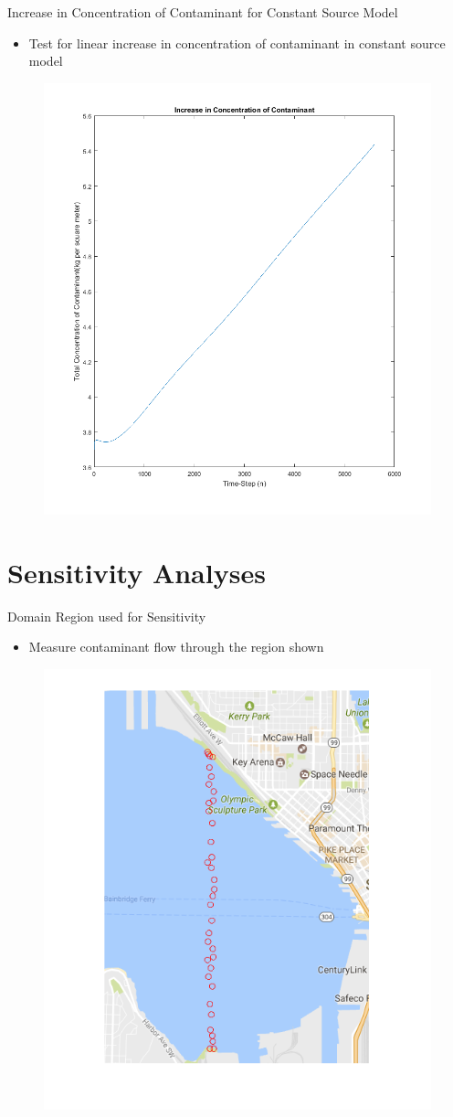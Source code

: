 \documentclass[10pt]{beamer}
\begin{document}
\begin{frame}{Increase in Concentration of Contaminant for Constant Source Model}\label{ConstIncrease}

\begin{itemize}
\item Test for linear increase in concentration of contaminant in constant source model
\end{itemize}

\begin{figure} 
\includegraphics[trim=0mm 0mm 0mm 0mm,clip,width=0.5\linewidth]{constincrease.png}
\end{figure}
\hyperlink{Questions}{}
\end{frame}

\section{Sensitivity Analyses}

\begin{frame}{Domain Region used for Sensitivity}\label{Region}

\begin{itemize}
\item Measure contaminant flow through the region shown
\end{itemize}

\begin{figure} 
\includegraphics[trim=0mm 0mm 0mm 0mm,clip,width=0.5\linewidth]{sensewall.png}
\end{figure}
\hyperlink{Questions}{}
\end{frame}
\end{document}
